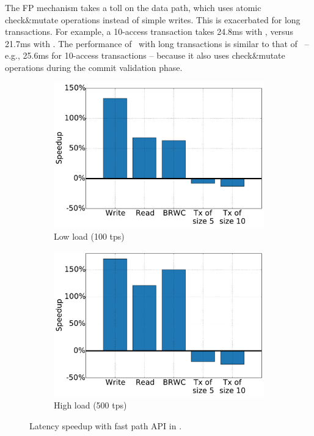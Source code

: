 The FP mechanism takes a toll on the data path, which uses atomic check\&mutate operations 
instead of simple writes. This is exacerbated for long transactions.
For example, a 10-access transaction takes 24.8ms with \sys, 
versus 21.7ms with  \sysll. The performance of \syspc\ with long transactions is similar to that of \sys\ -- e.g., 25.6ms for 10-access transactions -- 
because it also uses check\&mutate operations during the commit validation phase.

 

\begin{figure}[h!]
\centering
\begin{subfigure}[t]{0.48\textwidth}
\centerline{
\includegraphics[width=.9\textwidth]{figs/low_speedup.pdf}
}
\caption{Low load (100 tps)} 
\label{fig:slowdown-low}
\end{subfigure} 
\begin{subfigure}[t]{0.48\textwidth}
\centerline{
\includegraphics[width=.9\textwidth]{figs/high_speedup.pdf}
}
\caption{High load (500 tps)} 
\label{fig:slowdown-high}
\end{subfigure} 
\caption{Latency speedup with  fast path API in {\sys}.}
\label{fig:fp-tradeoff}
\end{figure}



